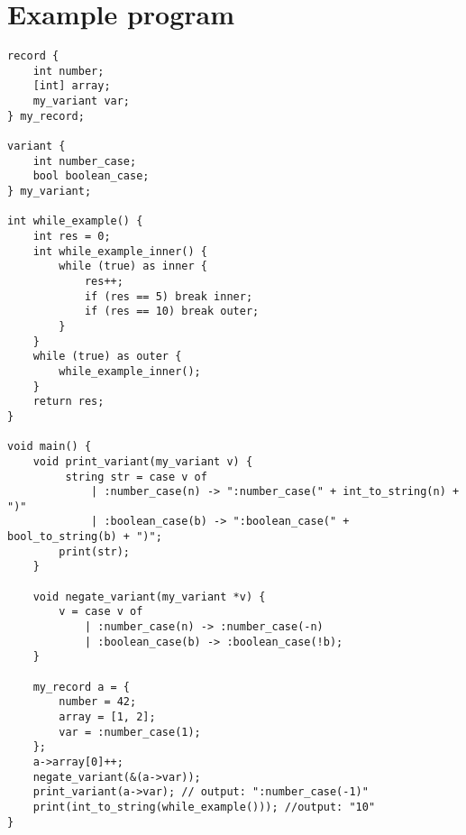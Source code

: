 \documentclass[a4paper,8pt]{extarticle}
\begin{document}
\section{Example program}
\begin{lstlisting}
record {
    int number;
    [int] array;
    my_variant var;
} my_record;

variant {
    int number_case;
    bool boolean_case;
} my_variant;

int while_example() {
    int res = 0;
    int while_example_inner() {
        while (true) as inner {
            res++;
            if (res == 5) break inner;
            if (res == 10) break outer;
        }
    }
    while (true) as outer {
        while_example_inner();
    }
    return res;
}

void main() {
    void print_variant(my_variant v) {
         string str = case v of
             | :number_case(n) -> ":number_case(" + int_to_string(n) + ")"
             | :boolean_case(b) -> ":boolean_case(" + bool_to_string(b) + ")";
        print(str);
    }

    void negate_variant(my_variant *v) {
        v = case v of
            | :number_case(n) -> :number_case(-n)
            | :boolean_case(b) -> :boolean_case(!b);
    }

    my_record a = {
        number = 42;
        array = [1, 2];
        var = :number_case(1);
    };
    a->array[0]++;
    negate_variant(&(a->var));
    print_variant(a->var); // output: ":number_case(-1)"
    print(int_to_string(while_example())); //output: "10"
}
\end{lstlisting}
\end{document}
